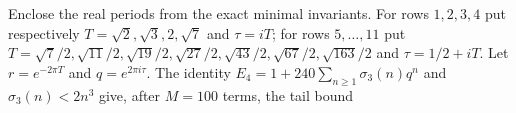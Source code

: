 \item Enclose the real periods from the exact minimal invariants.  For rows $1,2,3,4$
put respectively $T=\sqrt2,\sqrt3,2,\sqrt7$ and $\tau=iT$;
for rows $5,\ldots,11$ put
$T=\sqrt{7}/2,\sqrt{11}/2,\sqrt{19}/2,\sqrt{27}/2,
\sqrt{43}/2,\sqrt{67}/2,\sqrt{163}/2$ and $\tau=1/2+iT$.
Let $r=e^{-2\pi T}$ and $q=e^{2\pi i\tau}$.  The identity
$E_4=1+240\sum_{n\geq1}\sigma_3(n)q^n$ and
$\sigma_3(n)<2n^3$ give, after $M=100$ terms, the tail bound
